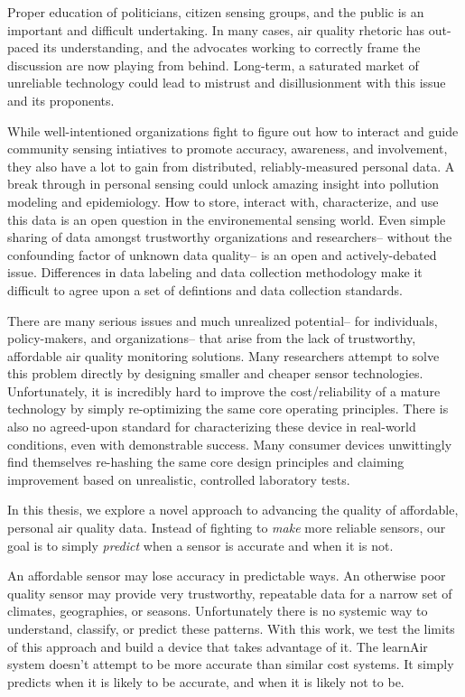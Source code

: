 Proper education of politicians, citizen sensing groups, and the public is an important and difficult undertaking.  In many cases, air quality rhetoric has out-paced its understanding, and the advocates working to correctly frame the discussion are now playing from behind.  Long-term, a saturated market of unreliable technology could lead to mistrust and disillusionment with this issue and its proponents.

While well-intentioned organizations fight to figure out how to interact and guide community sensing intiatives to promote accuracy, awareness, and involvement, they also have a lot to gain from distributed, reliably-measured personal data.  A break through in personal sensing could unlock amazing insight into pollution modeling and epidemiology.  How to store, interact with, characterize, and use this data is an open question in the environemental sensing world.  Even simple sharing of data amongst trustworthy organizations and researchers-- without the confounding factor of unknown data quality-- is an open and actively-debated issue.  Differences in data labeling and data collection methodology make it difficult to agree upon a set of defintions and data collection standards.

There are many serious issues and much unrealized potential-- for individuals, policy-makers, and organizations-- that arise from the lack of trustworthy, affordable air quality monitoring solutions.  Many researchers attempt to solve this problem directly by designing smaller and cheaper sensor technologies.  Unfortunately, it is incredibly hard to improve the cost/reliability of a mature technology by simply re-optimizing the same core operating principles.  There is also no agreed-upon standard for characterizing these device in real-world conditions, even with demonstrable success.    Many consumer devices unwittingly find themselves re-hashing the same core design principles and claiming improvement based on unrealistic, controlled laboratory tests.   

In this thesis, we explore a novel approach to advancing the quality of affordable, personal air quality data.  Instead of fighting to \textit{make} more reliable sensors, our goal is to simply \textit{predict} when a sensor is accurate and when it is not.  

An affordable sensor may lose accuracy in predictable ways.  An otherwise poor quality sensor may provide very trustworthy, repeatable data for a narrow set of climates, geographies, or seasons.  Unfortunately there is no systemic way to understand, classify, or predict these patterns.  With this work, we test the limits of this approach and build a device that takes advantage of it.  The learnAir system doesn't attempt to be more accurate than similar cost systems.  It simply predicts when it is likely to be accurate, and when it is likely not to be.  

